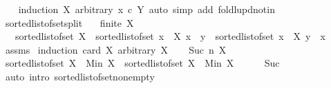 \begin{isabellebody}
%
\isadelimproof
\ \ %
\endisadelimproof
%
\isatagproof
{}\isamarkupfalse%
\ {\isacharparenleft}{\kern0pt}induction\ X\ arbitrary{\isacharcolon}{\kern0pt}\ x\ c\ Y{\isacharparenright}{\kern0pt}\ {\isacharparenleft}{\kern0pt}auto\ simp\ add{\isacharcolon}{\kern0pt}\ foldl{\isacharunderscore}{\kern0pt}upd{\isacharunderscore}{\kern0pt}notin{\isacharparenright}{\kern0pt}%
\endisatagproof
{\isafoldproof}%
%
\isadelimproof
\isanewline
%
\endisadelimproof
\isanewline
{}\isamarkupfalse%
\ sorted{\isacharunderscore}{\kern0pt}list{\isacharunderscore}{\kern0pt}of{\isacharunderscore}{\kern0pt}set{\isacharunderscore}{\kern0pt}split{\isacharcolon}{\kern0pt}\isanewline
\ \ \ {\isachardoublequoteopen}finite\ X{\isachardoublequoteclose}\isanewline
\ \ \ {\isachardoublequoteopen}sorted{\isacharunderscore}{\kern0pt}list{\isacharunderscore}{\kern0pt}of{\isacharunderscore}{\kern0pt}set\ X\ {\isacharequal}{\kern0pt}\ sorted{\isacharunderscore}{\kern0pt}list{\isacharunderscore}{\kern0pt}of{\isacharunderscore}{\kern0pt}set\ {\isacharbraceleft}{\kern0pt}x\ {\isasymin}\ X{\isachardot}{\kern0pt}\ x\ {\isacharless}{\kern0pt}\ y{\isacharbraceright}{\kern0pt}\ {\isacharat}{\kern0pt}\ sorted{\isacharunderscore}{\kern0pt}list{\isacharunderscore}{\kern0pt}of{\isacharunderscore}{\kern0pt}set\ {\isacharbraceleft}{\kern0pt}x\ {\isasymin}\ X{\isachardot}{\kern0pt}\ y\ {\isasymle}\ x{\isacharbraceright}{\kern0pt}{\isachardoublequoteclose}\isanewline
%
\isadelimproof
\ \ %
\endisadelimproof
%
\isatagproof
{}\isamarkupfalse%
\ assms\isanewline
{}\isamarkupfalse%
\ {\isacharparenleft}{\kern0pt}induction\ {\isachardoublequoteopen}card\ X{\isachardoublequoteclose}\ arbitrary{\isacharcolon}{\kern0pt}\ X{\isacharparenright}{\kern0pt}\isanewline
\ \ \isamarkupfalse%
\ {\isacharparenleft}{\kern0pt}Suc\ n\ X{\isacharparenright}{\kern0pt}\isanewline
\ \ \isamarkupfalse%
\ {\isachardoublequoteopen}sorted{\isacharunderscore}{\kern0pt}list{\isacharunderscore}{\kern0pt}of{\isacharunderscore}{\kern0pt}set\ X\ {\isacharequal}{\kern0pt}\ Min\ X\ {\isacharhash}{\kern0pt}\ sorted{\isacharunderscore}{\kern0pt}list{\isacharunderscore}{\kern0pt}of{\isacharunderscore}{\kern0pt}set\ {\isacharparenleft}{\kern0pt}X\ {\isacharminus}{\kern0pt}\ {\isacharbraceleft}{\kern0pt}Min\ X{\isacharbraceright}{\kern0pt}{\isacharparenright}{\kern0pt}{\isachardoublequoteclose}\isanewline
\ \ \ \ \isamarkupfalse%
\ Suc\ \isamarkupfalse%
\ {\isacharparenleft}{\kern0pt}auto\ intro{\isacharcolon}{\kern0pt}\ sorted{\isacharunderscore}{\kern0pt}list{\isacharunderscore}{\kern0pt}of{\isacharunderscore}{\kern0pt}set{\isacharunderscore}{\kern0pt}nonempty{\isacharparenright}{\kern0pt}\isanewline

\end{isabellebody}
